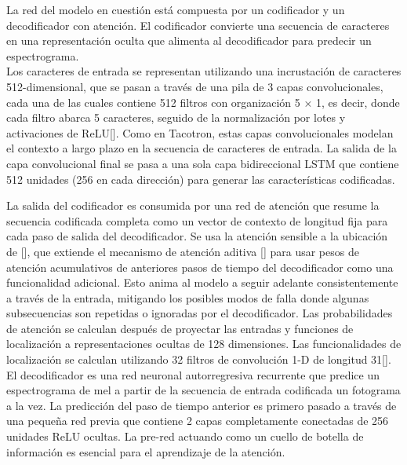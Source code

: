 La red del modelo en cuestión está compuesta por un codificador y un decodificador con atención. El codificador convierte una secuencia de caracteres en una representación oculta que alimenta al decodificador para predecir un espectrograma.\\  

Los caracteres de entrada se representan utilizando una incrustación de caracteres 512-dimensional, que se pasan a través de una pila de 3 capas convolucionales, cada una de las cuales contiene 512 filtros con organización 5 × 1, es decir, donde cada filtro abarca 5 caracteres, seguido de la normalización por lotes y activaciones de ReLU[\cite{shen2018natural}]. Como en Tacotron, estas capas convolucionales modelan el contexto a largo plazo en la secuencia de caracteres de entrada. La salida de la capa convolucional final se pasa a una sola capa bidireccional LSTM que contiene 512 unidades (256 en cada dirección) para generar las características codificadas.



La salida del codificador es consumida por una red de atención que resume la secuencia codificada completa como un vector de contexto de longitud fija para cada paso de salida del decodificador. Se usa la atención sensible a la ubicación de [\cite{chorowski2015attention}], que extiende el mecanismo de atención aditiva [\cite{bahdanau2014neural}] para usar pesos de atención acumulativos de anteriores pasos de tiempo del decodificador como una funcionalidad adicional. Esto anima al modelo a seguir adelante consistentemente a través de la entrada, mitigando los posibles modos de falla donde algunas subsecuencias son repetidas o ignoradas por el decodificador.
Las probabilidades de atención se calculan después de proyectar las entradas y funciones de localización a representaciones ocultas de 128 dimensiones. Las funcionalidades de localización se calculan utilizando 32 filtros de convolución 1-D de longitud 31[\cite{shen2018natural}]. \\

El decodificador es una red neuronal autorregresiva recurrente que predice un espectrograma de mel a partir de la secuencia de entrada codificada un fotograma a la vez. La predicción del paso de tiempo anterior es primero pasado a través de una pequeña red previa que contiene 2 capas completamente conectadas de 256 unidades ReLU ocultas. La pre-red actuando como un cuello de botella de información es esencial para el aprendizaje de la atención.

